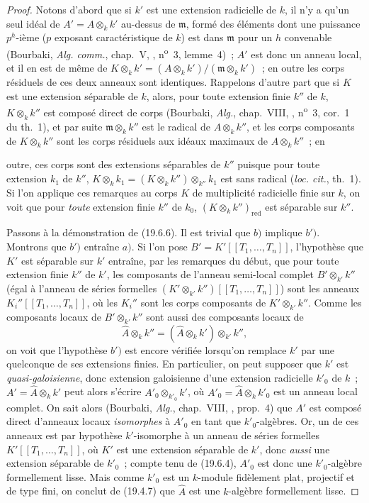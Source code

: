 \begin{proof}
Notons d'abord que si $k'$ est une extension radicielle de $k$, il n'y a qu'un
seul idéal de $A'=A\otimes_k k'$ au-dessus de $\mathfrak m$, formé des éléments
dont une puissance $p^h$-ième ($p$ exposant caractéristique de $k$) est dans
$\mathfrak m$ pour un $h$ convenable (Bourbaki, \emph{Alg. comm.}, chap.~V,
, n\textsuperscript{o}~3, lemme~4)~; $A'$ est donc un anneau
local, et il en est de même de
$K\otimes_k k'=(A\otimes_k k')/(\mathfrak m\otimes_k k')$~; en outre les corps
résiduels de ces deux anneaux sont identiques. Rappelons d'autre part que si
$K$ est une extension séparable de $k$, alors, pour toute extension finie
$k''$ de $k$, $K\otimes_k k''$ est composé direct de corps (Bourbaki,
\emph{Alg.}, chap.~VIII, , n\textsuperscript{o}~3, cor.~1 du
th.~1), et par suite $\mathfrak m\otimes_k k''$ est le radical de
$A\otimes_k k''$, et les corps composants de $K\otimes_k k''$ sont les corps
résiduels aux idéaux maximaux de $A\otimes_k k''$~; en


outre, ces corps sont des extensions séparables de $k''$ puisque pour toute
extension $k_1$ de $k''$,
$K\otimes_k k_1=(K\otimes_k k'')\otimes_{k''}k_1$ est sans radical
(\emph{loc. cit.}, th.~1). Si l'on applique ces remarques au corps $K$ de
multiplicité radicielle finie sur $k$, on voit que pour \emph{toute} extension
finie $k''$ de $k_0$, $(K\otimes_k k'')_{\mathrm{red}}$ est séparable sur
$k''$.

Passons à la démonstration de (19.6.6). Il est trivial que $b)$ implique
$b')$. Montrons que $b')$ entraîne $a)$. Si l'on pose
$B'=K'[[T_1,\ldots,T_n]]$, l'hypothèse que $K'$ est séparable sur $k'$
entraîne, par les remarques du début, que pour toute extension finie $k''$ de
$k'$, les composants de l'anneau semi-local complet $B'\otimes_{k'}k''$
(égal à l'anneau de séries formelles
$(K'\otimes_{k'}k'')[[T_1,\ldots,T_n]]$) sont les anneaux
$K_i''[[T_1,\ldots,T_n]]$, où les $K_i''$ sont les corps composants de
$K'\otimes_{k'}k''$. Comme les composants locaux de $B'\otimes_{k'}k''$ sont
aussi des composants locaux de
\[
  \widehat A\otimes_k k''
  =(\widehat A\otimes_k k')\otimes_{k'}k'',
\]
on voit que l'hypothèse $b')$ est encore vérifiée lorsqu'on remplace $k'$ par
une quelconque de ses extensions finies. En particulier, on peut supposer que
$k'$ est \emph{quasi-galoisienne}, donc extension galoisienne d'une extension
radicielle $k'_0$ de $k$~; $A'=\widehat A\otimes_k k'$ peut alors s'écrire
$A'_0\otimes_{k'_0}k'$, où $A'_0=\widehat A\otimes_k k'_0$ est un anneau
local complet. On sait alors (Bourbaki, \emph{Alg.}, chap.~VIII,
, prop.~4) que $A'$ est composé direct d'anneaux locaux
\emph{isomorphes} à $A'_0$ en tant que $k'_0$-algèbres. Or, un de ces anneaux
est par hypothèse $k'$-isomorphe à un anneau de séries formelles
$K'[[T_1,\ldots,T_n]]$, où $K'$ est une extension séparable de $k'$, donc
\emph{aussi} une extension séparable de $k'_0$~; compte tenu de (19.6.4),
$A'_0$ est donc une $k'_0$-algèbre formellement lisse. Mais comme $k'_0$ est
un $k$-module fidèlement plat, projectif et de type fini, on conclut de
(19.4.7) que $\widehat A$ est une $k$-algèbre formellement lisse.


\end{proof}
